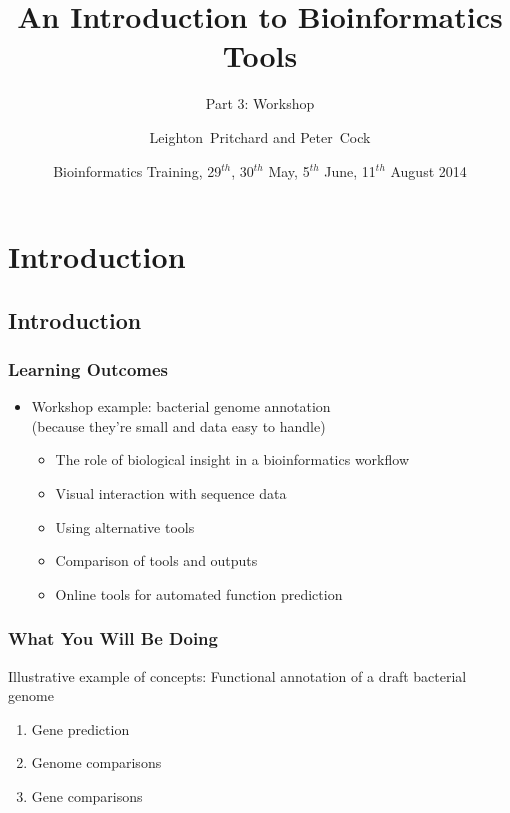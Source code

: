 
%



\title[Intro to Bioinformatics] %
{An Introduction to Bioinformatics Tools}
\subtitle{Part 3: Workshop}
\author[Pritchard, Cock] %
{Leighton~Pritchard and Peter~Cock}
\date[May, June, August 2014] %
{Bioinformatics Training, 29$^{th}$, 30$^{th}$ May, 5$^{th}$ June, 11$^{th}$ August 2014}
\subject{Bioinformatics}





\frame[plain]{\titlepage}
 
\section{Introduction}
\subsection{Introduction}
\begin{frame}
  \frametitle{Learning Outcomes}
  \begin{itemize}
    \item Workshop example: bacterial genome annotation \\
             (because they're small and data easy to handle)
    \begin{itemize}
      \item The role of biological insight in a bioinformatics workflow
      \item Visual interaction with sequence data
      \item Using alternative tools
      \item Comparison of tools and outputs
      \item Online tools for automated function prediction
    \end{itemize}
  \end{itemize}
\end{frame} 
  
\begin{frame}
  \frametitle{What You Will Be Doing}
  Illustrative example of concepts: Functional annotation of a draft bacterial genome
  \begin{enumerate}
    \item Gene prediction
    \item Genome comparisons
    \item Gene comparisons
  \end{enumerate}
\end{frame}

